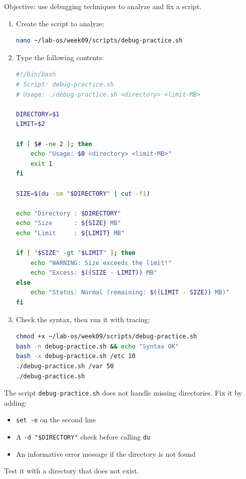 Objective: use debugging techniques to analyze and fix a script.

\begin{enumerate}
  \item Create the script to analyze:
\begin{lstlisting}[language=bash, caption={Creating debug-practice.sh}]
nano ~/lab-os/week09/scripts/debug-practice.sh
\end{lstlisting}

  \item Type the following contents:
\begin{lstlisting}[language=bash, caption={Contents of debug-practice.sh}]
#!/bin/bash
# Script: debug-practice.sh
# Usage: ./debug-practice.sh <directory> <limit-MB>

DIRECTORY=$1
LIMIT=$2

if [ $# -ne 2 ]; then
    echo "Usage: $0 <directory> <limit-MB>"
    exit 1
fi

SIZE=$(du -sm "$DIRECTORY" | cut -f1)

echo "Directory : $DIRECTORY"
echo "Size      : ${SIZE} MB"
echo "Limit     : ${LIMIT} MB"

if [ "$SIZE" -gt "$LIMIT" ]; then
    echo "WARNING: Size exceeds the limit!"
    echo "Excess: $((SIZE - LIMIT)) MB"
else
    echo "Status: Normal (remaining: $((LIMIT - SIZE)) MB)"
fi
\end{lstlisting}

  \item Check the syntax, then run it with tracing:
\begin{lstlisting}[language=bash, caption={Analyzing the script with debugging}]
chmod +x ~/lab-os/week09/scripts/debug-practice.sh
bash -n debug-practice.sh && echo "Syntax OK"
bash -x debug-practice.sh /etc 10
./debug-practice.sh /var 50
./debug-practice.sh
\end{lstlisting}
\end{enumerate}

\begin{exercisebox}[Exercise 9.5]
The script \texttt{debug-practice.sh} does not handle missing directories.
Fix it by adding:
\begin{itemize}
  \item \texttt{set -e} on the second line
  \item A \texttt{-d "\$DIRECTORY"} check before calling \texttt{du}
  \item An informative error message if the directory is not found
\end{itemize}
Test it with a directory that does not exist.
\end{exercisebox}


